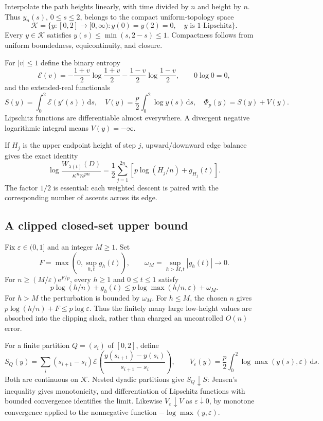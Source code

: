 \documentclass[11pt,letterpaper]{article}
\numberwithin{equation}{section}
\theoremstyle{remark}\newtheorem{remark}[theorem]{Remark}
\newcommand{\K}{\mathcal K}\newcommand{\ee}{\mathrm e}\newcommand{\dd}{\,\mathrm d}
\begin{document}
Interpolate the path heights linearly, with time divided by $n$ and height by $n$. Thus $y_n(s)$, $0\le s\le2$, belongs to the compact uniform-topology space
\[
 \K=\{y:[0,2]\to[0,\infty):y(0)=y(2)=0,\quad y\text{ is }1\text{-Lipschitz}\}.
\]
Every $y\in\K$ satisfies $y(s)\le\min(s,2-s)\le1$. Compactness follows from uniform boundedness, equicontinuity, and closure.

For $|v|\le1$ define the binary entropy
\[
 \mathcal E(v)=-\frac{1+v}{2}\log\frac{1+v}{2}
              -\frac{1-v}{2}\log\frac{1-v}{2},\qquad0\log0=0,
\]
and the extended-real functionals
\begin{equation}\label{pwd:rc:eq:variational}
 S(y)=\int_0^2\mathcal E(y'(s))\dd s,\quad
 V(y)=\frac p2\int_0^2\log y(s)\dd s,\quad
 \Phi_p(y)=S(y)+V(y).
\end{equation}
Lipschitz functions are differentiable almost everywhere. A divergent negative logarithmic integral means $V(y)=-\infty$.

If $H_j$ is the upper endpoint height of step $j$, upward/downward edge balance gives the exact identity
\begin{equation}\label{pwd:rc:eq:step-weight}
 \log\frac{W_{\lambda(t)}(D)}{\kappa^n n^{pn}}
 =\frac12\sum_{j=1}^{2n}\left[p\log(H_j/n)+g_{H_j}(t)\right].
\end{equation}
The factor $1/2$ is essential: each weighted descent is paired with the corresponding number of ascents across its edge.

\subsection{A clipped closed-set upper bound}
Fix $\varepsilon\in(0,1]$ and an integer $M\ge1$. Set
\[
 F=\max(0,\sup_{h,t}g_h(t)),\qquad\omega_M=\sup_{h>M,t}|g_h(t)|\longrightarrow0.
\]
For $n\ge(M/\varepsilon)\ee^{F/p}$, every $h\ge1$ and $0\le t\le1$ satisfy
\begin{equation}\label{pwd:rc:eq:clipping}
 p\log(h/n)+g_h(t)\le p\log\max(h/n,\varepsilon)+\omega_M.
\end{equation}
For $h>M$ the perturbation is bounded by $\omega_M$. For $h\le M$, the chosen $n$ gives $p\log(h/n)+F\le p\log\varepsilon$. Thus the finitely many large low-height values are absorbed into the clipping slack, rather than charged an uncontrolled $O(n)$ error.

For a finite partition $Q=(s_i)$ of $[0,2]$, define
\[
 S_Q(y)=\sum_i(s_{i+1}-s_i)\mathcal E\left(\frac{y(s_{i+1})-y(s_i)}{s_{i+1}-s_i}\right),\qquad
 V_\varepsilon(y)=\frac p2\int_0^2\log\max(y(s),\varepsilon)\dd s.
\]
Both are continuous on $\K$. Nested dyadic partitions give $S_Q\downarrow S$: Jensen's inequality gives monotonicity, and differentiation of Lipschitz functions with bounded convergence identifies the limit. Likewise $V_\varepsilon\downarrow V$ as $\varepsilon\downarrow0$, by monotone convergence applied to the nonnegative function $-\log\max(y,\varepsilon)$.
\end{document}
